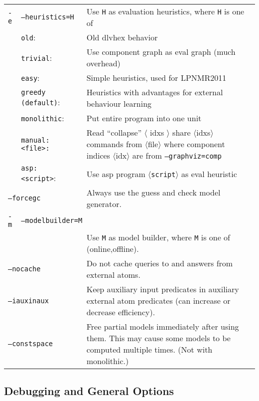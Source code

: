 \documentclass[a4paper, titlepage]{article}
\begin{document}
\begin{longtable}{ p{2.0em} p{2.2cm} p{0.6cm} p{8.0cm} }
\texttt{-e}& \multicolumn{2}{l}{\texttt{--heuristics=H}} &
Use \texttt{H} as evaluation heuristics, where \texttt{H} is one of\\
&\texttt{old}:&&Old dlvhex behavior\\
&\texttt{trivial}:&&Use component graph as eval graph (much overhead)\\
&\texttt{easy}:&&Simple heuristics, used for LPNMR2011\\
&\texttt{greedy (default)}:&& Heuristics with advantages for external behaviour learning\\
&\texttt{monolithic}:&& Put entire program into one unit\\
&\texttt{manual:<file>:} &&  Read ``collapse'' $\langle$ idxs $\rangle$ share $\langle$idxs$\rangle$ commands from $\langle$file$\rangle$ where component indices $\langle$idx$\rangle$ are from \texttt{--graphviz=comp}\\
&\texttt{asp:<script>}:&&Use asp program $\langle$\texttt{script}$\rangle$ as eval heuristic\\
\multicolumn{3}{l}{\texttt{--forcegc}} &
  Always use the guess and check model generator.\\
\texttt{-m}& \multicolumn{3}{l}{\texttt{--modelbuilder=M}} \\
&&& Use \texttt{M} as model builder, where \texttt{M} is one of (online,offline).\\
\multicolumn{2}{l}{\texttt{--nocache}} &&
  Do not cache queries to and answers from external atoms.\\
\multicolumn{2}{l}{\texttt{--iauxinaux}} &&
  Keep auxiliary input predicates in auxiliary external atom predicates (can increase or decrease efficiency).\\
\multicolumn{2}{l}{\texttt{--constspace}} &&
  Free partial models immediately after using them. This may cause some models to be computed multiple times. (Not with monolithic.)
\end{longtable}

\subsection{Debugging and General Options}
\end{document}
